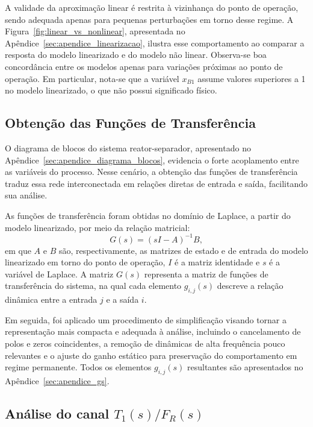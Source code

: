 A validade da aproximação linear é restrita à vizinhança do ponto de operação, sendo adequada apenas para pequenas perturbações em torno desse regime.
A Figura~\ref{fig:linear_vs_nonlinear}, apresentada no Apêndice~\ref{sec:apendice_linearizacao}, ilustra esse comportamento ao comparar a resposta do modelo linearizado e do modelo não linear.
Observa-se boa concordância entre os modelos apenas para variações próximas ao ponto de operação.
Em particular, nota-se que a variável $x_{B1}$ assume valores superiores a 1 no modelo linearizado, o que não possui significado físico.

\subsection{Obtenção das Funções de Transferência}

O diagrama de blocos do sistema reator-separador, apresentado no Apêndice~\ref{sec:apendice_diagrama_blocos}, evidencia o forte acoplamento entre as variáveis do processo.
Nesse cenário, a obtenção das funções de transferência traduz essa rede interconectada em relações diretas de entrada e saída, facilitando sua análise.

As funções de transferência foram obtidas no domínio de Laplace, a partir do modelo linearizado, por meio da relação matricial:
\begin{equation}
  G(s) = (sI - A)^{-1}B,
\end{equation}
em que $A$ e $B$ são, respectivamente, as matrizes de estado e de entrada do modelo linearizado em torno do ponto de operação, $I$ é a matriz identidade e $s$ é a variável de Laplace.
A matriz $G(s)$ representa a matriz de funções de transferência do sistema, na qual cada elemento $g_{i,j}(s)$ descreve a relação dinâmica entre a entrada $j$ e a saída $i$.

Em seguida, foi aplicado um procedimento de simplificação visando tornar a representação mais compacta e adequada à análise, incluindo o cancelamento de polos e zeros coincidentes, a remoção de dinâmicas de alta frequência pouco relevantes e o ajuste do ganho estático para preservação do comportamento em regime permanente.
Todos os elementos $g_{i,j}(s)$ resultantes são apresentados no Apêndice~\ref{sec:apendice_gs}.

\subsection{Análise do canal $T_1(s)/F_R(s)$}

